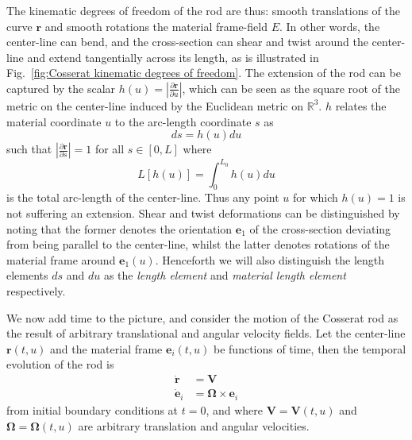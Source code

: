The kinematic degrees of freedom of the rod are thus: smooth translations of the curve $\mathbf{r}$ and smooth rotations the material frame-field $E$. In other words, the center-line can bend, and the cross-section can shear and twist around the center-line and extend tangentially across its length, as is illustrated in Fig.~\ref{fig:Cosserat kinematic degrees of freedom}. The extension of the rod can be captured by the scalar $h(u) = \left| \frac{\partial \mathbf{r}}{\partial u} \right| $, which can be seen as the square root of the metric on the center-line induced by the Euclidean metric on $\mathbb{R}^3$. $h$ relates the material coordinate $u$ to the arc-length coordinate $s$ as
\begin{equation}
ds = h(u) du
\end{equation}
such that $ \left| \frac{\partial \mathbf{r}}{\partial s} \right| = 1$ for all $s \in [0, L]$ where
\begin{equation}
L[h(u)] = \int_0^{L_0} h(u) du
\end{equation}
is the total arc-length of the center-line. Thus any point $u$ for which $h(u)=1$ is not suffering an extension. Shear and twist deformations can be distinguished by noting that the former denotes the orientation $\mathbf{e}_1$ of the cross-section deviating from being parallel to the center-line, whilst the latter denotes rotations of the material frame around $\mathbf{e}_1(u)$. Henceforth we will also distinguish the length elements $ds$ and $du$ as the \textit{length element} and \textit{material length element} respectively.

We now add time to the picture, and consider the motion of the Cosserat rod as the result of arbitrary translational and angular velocity fields. Let the center-line $\mathbf{r}(t,u)$ and the material frame $\mathbf{e}_i(t,u)$ be functions of time, then the temporal evolution of the rod is
\begin{subequations} \label{eq:Cosserat rod kinematic equations}
  \begin{align}
\dot{\mathbf{r}} & = \mathbf{V} \label{eq:Cosserat rod r kinematic eom} \\
\dot{\mathbf{e}}_i & = \boldsymbol{\Omega} \times \mathbf{e}_i \label{eq:Cosserat rod e_i kinematic eom}
  \end{align}
\end{subequations}
from initial boundary conditions at $t=0$, and where $\mathbf{V} = \mathbf{V}(t,u)$ and $\boldsymbol{\Omega} = \boldsymbol{\Omega}(t,u)$ are arbitrary translation and angular velocities.

